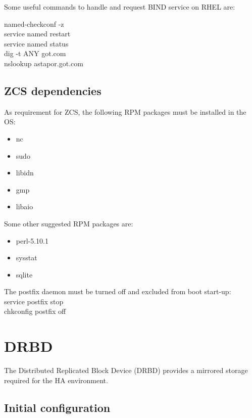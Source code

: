\documentclass[a4paper, 12pt]{book}
\begin{document}
\noindent Some useful commands to handle and request BIND service on RHEL are:

named-checkconf -z \\
\indent service named restart \\
\indent service named status \\
\indent dig -t ANY got.com \\
\indent nslookup astapor.got.com \\


\subsection{ZCS dependencies}
\label{sec:zcsdeps}

As requirement for ZCS, the following RPM packages must be installed in the OS:

\begin{itemize}
	\item nc
	\item sudo
	\item libidn 
	\item gmp 
	\item libaio 
\end{itemize}

\noindent Some other suggested RPM packages are:

\begin{itemize}
	\item perl-5.10.1
	\item sysstat 
	\item sqlite 
\end{itemize}

\noindent The postfix daemon must be turned off and excluded from boot start-up:\\
\indent service postfix stop\\
\indent chkconfig postfix off\\


\section{DRBD}
\label{sec:drbd}

\noindent The Distributed Replicated Block Device (DRBD) provides a mirrored storage required for the HA environment.


\subsection{Initial configuration}
\label{sec:initialconf}
\end{document}
